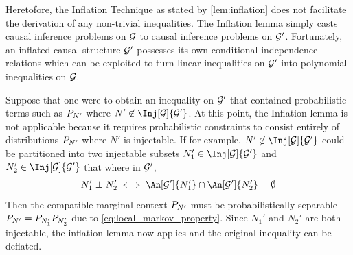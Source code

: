 \documentclass[aps, 10pt, english, twoside, pra, nofootinbib, tightenlines, longbibliography]{revtex4-1}
\begin{document}
    Heretofore, the Inflation Technique as stated by \cref{lem:inflation} does not facilitate the derivation of any non-trivial inequalities. The Inflation lemma simply casts causal inference problems on $\mathcal{G}$ to causal inference problems on $\mathcal{G}'$. Fortunately, an inflated causal structure $\mathcal{G}'$ possesses its own conditional independence relations which can be exploited to turn linear inequalities on $\mathcal{G}'$ into polynomial inequalities on $\mathcal{G}$.

    Suppose that one were to obtain an inequality on $\mathcal{G}'$ that contained probabilistic terms such as $\prob[N']$ where $N' \not \in \Inj[\graph]{\graph'}$. At this point, the Inflation lemma is not applicable because it requires probabilistic constraints to consist entirely of distributions $\prob[N']$ where $N'$ is injectable. If for example, $N' \not \in \Inj[\graph]{\graph'}$ could be partitioned into two injectable subsets $N_1' \in \Inj[\graph]{\graph'}$ and $N_2' \in \Inj[\graph]{\graph'}$ that where  in $\mathcal{G}'$,
    \[ N_1' \ancestralindep N_2' \iff \An[\graph']{N_1'} \cap \An[\graph']{N_2'}= \emptyset \]
    Then the compatible marginal context $\prob[N']$ must be probabilistically separable $\prob[N'] = \prob[N_1']\prob[N_2']$ due to \cref{eq:local_markov_property}. Since $N_1'$ and $N_2'$ are both injectable, the inflation lemma now applies and the original inequality can be deflated.

    \begin{center}
    \end{center}
\end{document}
